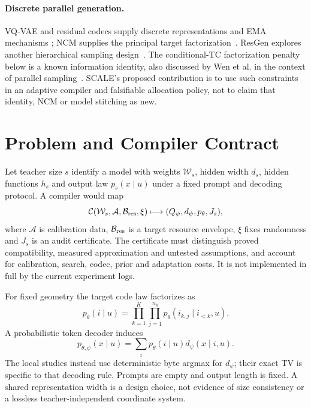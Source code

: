\documentclass[11pt,a4paper]{article}
\begin{document}
\paragraph{Discrete parallel generation.}
VQ-VAE and residual codecs supply discrete representations and EMA mechanisms
\citep{oord2017vqvae,zeghidour2021soundstream}; NCM supplies the principal target
factorization~\citep{kumbong2026ncm}. ResGen explores another hierarchical
sampling design~\citep{kim2025resgen}. The conditional-TC factorization penalty
below is a known information identity, also discussed by Wen et al. in the
context of parallel sampling~\citep{wen2026parallel}. SCALE's proposed
contribution is to use such constraints in an adaptive compiler and falsifiable
allocation policy, not to claim that identity, NCM or model stitching as new.

\section{Problem and Compiler Contract}
Let teacher size \(s\) identify a model with weights \(\mathcal W_s\), hidden width
\(d_s\), hidden functions \(h_s\) and output law \(p_s(x\mid u)\) under a fixed
prompt and decoding protocol. A compiler would map
\begin{equation}
 \mathcal C(\mathcal W_s,\mathcal A,\mathcal B_{\rm res},\xi)
   \longmapsto (Q_\psi,d_\psi,p_\theta,J_s),
\end{equation}
where \(\mathcal A\) is calibration data, \(\mathcal B_{\rm res}\) is a target
resource envelope, \(\xi\) fixes randomness and \(J_s\) is an audit certificate.
The certificate must distinguish proved compatibility, measured approximation
and untested assumptions, and account for calibration, search, codec, prior and
adaptation costs. It is not implemented in full by the current experiment logs.

For fixed geometry the target code law factorizes as
\begin{equation}
 p_\theta(i\mid u)=\prod_{k=1}^{K}\prod_{j=1}^{n_k}
 p_\theta(i_{k,j}\mid i_{<k},u).
 \label{eq:scalefactor}
\end{equation}
A probabilistic token decoder induces
\begin{equation}
 p_{\theta,\psi}(x\mid u)=\sum_i p_\theta(i\mid u)d_\psi(x\mid i,u).
 \label{eq:studentlaw}
\end{equation}
The local studies instead use deterministic byte argmax for \(d_\psi\); their
exact TV is specific to that decoding rule. Prompts are empty and output length
is fixed. A shared representation width is a design choice, not evidence of
size consistency or a lossless teacher-independent coordinate system.
\end{document}
